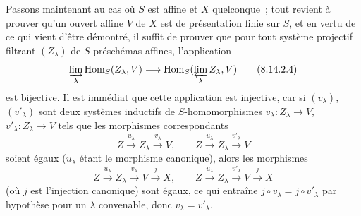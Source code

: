 Passons maintenant au cas où $S$ est affine et $X$ quelconque~; tout revient à
prouver qu'un ouvert affine $V$ de $X$ est de présentation finie sur $S$, et
en vertu de ce qui vient d'être démontré, il suffit de prouver que pour tout
système projectif filtrant $(Z_\lambda)$ de $S$-préschémas affines,
l'application
\begin{equation}
\label{IV.8.14.2.4-fr}
\varinjlim_\lambda\operatorname{Hom}_S(Z_\lambda,V)
\longrightarrow
\operatorname{Hom}_S(\varprojlim_\lambda Z_\lambda,V) \tag{8.14.2.4}
\end{equation}
est bijective. Il est immédiat que cette application est injective, car si
$(v_\lambda)$, $(v'_\lambda)$ sont deux systèmes inductifs de
$S$-homomorphismes $v_\lambda:Z_\lambda\to V$,
$v'_\lambda:Z_\lambda\to V$ tels que les morphismes correspondants
\[
Z\xrightarrow{u_\lambda}Z_\lambda\xrightarrow{v_\lambda}V,
\qquad
Z\xrightarrow{u_\lambda}Z_\lambda\xrightarrow{v'_\lambda}V
\]
soient égaux ($u_\lambda$ étant le morphisme canonique), alors les morphismes
\[
Z\xrightarrow{u_\lambda}Z_\lambda\xrightarrow{v_\lambda}V
\xrightarrow{j}X,
\qquad
Z\xrightarrow{u_\lambda}Z_\lambda\xrightarrow{v'_\lambda}V
\xrightarrow{j}X
\]
(où $j$ est l'injection canonique) sont égaux, ce qui entraîne
$j\circ v_\lambda=j\circ v'_\lambda$ par hypothèse pour un $\lambda$
convenable, donc $v_\lambda=v'_\lambda$.

